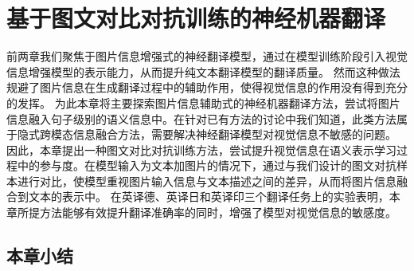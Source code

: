 \chapter{基于图文对比对抗训练的神经机器翻译}
前两章我们聚焦于图片信息增强式的神经翻译模型，通过在模型训练阶段引入视觉信息增强模型的表示能力，从而提升纯文本翻译模型的翻译质量。
然而这种做法规避了图片信息在生成翻译过程中的辅助作用，使得视觉信息的作用没有得到充分的发挥。
为此本章将主要探索图片信息辅助式的神经机器翻译方法，尝试将图片信息融入句子级别的语义信息中。在针对已有方法的讨论中我们知道，此类方法属于隐式跨模态信息融合方法，需要解决神经翻译模型对视觉信息不敏感的问题。
因此，本章提出一种图文对比对抗训练方法，尝试提升视觉信息在语义表示学习过程中的参与度。在模型输入为文本加图片的情况下，通过与我们设计的图文对抗样本进行对比，使模型重视图片输入信息与文本描述之间的差异，从而将图片信息融合到文本的表示中。
在英译德、英译日和英译印三个翻译任务上的实验表明，本章所提方法能够有效提升翻译准确率的同时，增强了模型对视觉信息的敏感度。







\section{本章小结}
